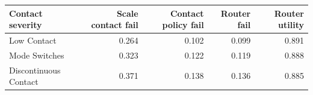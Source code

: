 \begin{tabular}{lrrrr}
\toprule
Contact severity & Scale contact fail & Contact policy fail & Router fail & Router utility \\
\midrule
Low Contact & 0.264 & 0.102 & 0.099 & 0.891 \\
Mode Switches & 0.323 & 0.122 & 0.119 & 0.888 \\
Discontinuous Contact & 0.371 & 0.138 & 0.136 & 0.885 \\
\bottomrule
\end{tabular}

